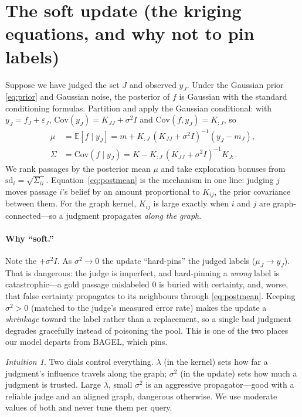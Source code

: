 \documentclass[11pt]{article}
\theoremstyle{plain}
\theoremstyle{definition}
\theoremstyle{remark}
\newtheorem*{intuition}{Intuition}\newtheorem*{stats}{Connection to statistics}\newtheorem*{remark}{Remark}
\newcommand{\E}{\mathbb{E}}\newcommand{\R}{\mathbb{R}}\newcommand{\N}{\mathcal{N}}
\newcommand{\Cov}{\mathrm{Cov}}\newcommand{\diag}{\mathrm{diag}}\newcommand{\tr}{\mathrm{tr}}
\begin{document}
\section{The soft update (the kriging equations, and why not to pin labels)}\label{sec:soft}
Suppose we have judged the set $J$ and observed $y_J$. Under the Gaussian prior \eqref{eq:prior} and Gaussian noise,
the posterior of $f$ is Gaussian with the standard conditioning formulas. Partition and apply the Gaussian
conditional: with $y_J = f_J+\varepsilon_J$, $\Cov(y_J)=K_{JJ}+\sigma^2 I$ and $\Cov(f, y_J)=K_{:J}$, so
\begin{align}
\mu &= \E[f\mid y_J] = m + K_{:J}\,(K_{JJ}+\sigma^2 I)^{-1}(y_J - m_J),\label{eq:postmean}\\
\Sigma &= \Cov(f\mid y_J) = K - K_{:J}\,(K_{JJ}+\sigma^2 I)^{-1}K_{J:}.\label{eq:postcov}
\end{align}
We rank passages by the posterior mean $\mu$ and take exploration bonuses from $\mathrm{sd}_i=\sqrt{\Sigma_{ii}}$.
Equation~\eqref{eq:postmean} is the mechanism in one line: judging $j$ moves passage $i$'s belief by an amount
proportional to $K_{ij}$, the prior covariance between them. For the graph kernel, $K_{ij}$ is large exactly when
$i$ and $j$ are graph-connected---so a judgment propagates \emph{along the graph}.

\paragraph{Why ``soft.''} Note the $+\sigma^2 I$. As $\sigma^2\to 0$ the update ``hard-pins'' the judged labels
($\mu_J\to y_J$). That is dangerous: the judge is imperfect, and hard-pinning a \emph{wrong} label is
catastrophic---a gold passage mislabeled $0$ is buried with certainty, and, worse, that false certainty propagates
to its neighbours through \eqref{eq:postmean}. Keeping $\sigma^2>0$ (matched to the judge's measured error rate)
makes the update a \emph{shrinkage} toward the label rather than a replacement, so a single bad judgment degrades
gracefully instead of poisoning the pool. This is one of the two places our model departs from BAGEL, which pins.

\begin{intuition}
Two dials control everything. $\lambda$ (in the kernel) sets how far a judgment's influence travels along the
graph; $\sigma^2$ (in the update) sets how much a judgment is trusted. Large $\lambda$, small $\sigma^2$ is an
aggressive propagator---good with a reliable judge and an aligned graph, dangerous otherwise. We use moderate values
of both and never tune them per query.
\end{intuition}
\end{document}
